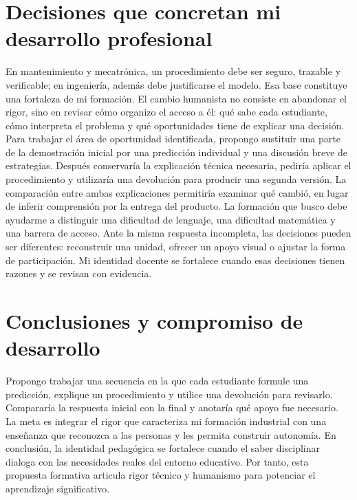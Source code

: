 \documentclass[spanish,letterpaper,oneside]{article}
\begin{document}
\section{Decisiones que concretan mi desarrollo profesional}
En mantenimiento y mecatrónica, un procedimiento debe ser seguro, trazable y verificable; en ingeniería, además debe justificarse el modelo. Esa base constituye una fortaleza de mi formación. El cambio humanista no consiste en abandonar el rigor, sino en revisar cómo organizo el acceso a él: qué sabe cada estudiante, cómo interpreta el problema y qué oportunidades tiene de explicar una decisión.
Para trabajar el área de oportunidad identificada, propongo sustituir una parte de la demostración inicial por una predicción individual y una discusión breve de estrategias. Después conservaría la explicación técnica necesaria, pediría aplicar el procedimiento y utilizaría una devolución para producir una segunda versión. La comparación entre ambas explicaciones permitiría examinar qué cambió, en lugar de inferir comprensión por la entrega del producto.
La formación que busco debe ayudarme a distinguir una dificultad de lenguaje, una dificultad matemática y una barrera de acceso. Ante la misma respuesta incompleta, las decisiones pueden ser diferentes: reconstruir una unidad, ofrecer un apoyo visual o ajustar la forma de participación. Mi identidad docente se fortalece cuando esas decisiones tienen razones y se revisan con evidencia.

\section{Conclusiones y compromiso de desarrollo}
Propongo trabajar una secuencia en la que cada estudiante formule una predicción, explique un procedimiento y utilice una devolución para revisarlo. Compararía la respuesta inicial con la final y anotaría qué apoyo fue necesario. La meta es integrar el rigor que caracteriza mi formación industrial con una enseñanza que reconozca a las personas y les permita construir autonomía. En conclusión, la identidad pedagógica se fortalece cuando el saber disciplinar dialoga con las necesidades reales del entorno educativo. Por tanto, esta propuesta formativa articula rigor técnico y humanismo para potenciar el aprendizaje significativo.
\end{document}
